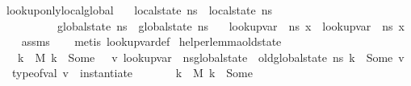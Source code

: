 \begin{isabellebody}
\isanewline
{}\isamarkupfalse%
\ lookup{\isacharunderscore}{\kern0pt}only{\isacharunderscore}{\kern0pt}local{\isacharunderscore}{\kern0pt}global{\isacharcolon}{\kern0pt}\isanewline
\ \ \ {\isachardoublequoteopen}local{\isacharunderscore}{\kern0pt}state\ ns\ {\isacharequal}{\kern0pt}\ local{\isacharunderscore}{\kern0pt}state\ ns{\isacharprime}{\kern0pt}{\isachardoublequoteclose}\ \isanewline
\ \ \ \ \ \ \ \ \ \ {\isachardoublequoteopen}global{\isacharunderscore}{\kern0pt}state\ ns\ {\isacharequal}{\kern0pt}\ global{\isacharunderscore}{\kern0pt}state\ ns{\isacharprime}{\kern0pt}{\isachardoublequoteclose}\isanewline
\ \ \ {\isachardoublequoteopen}lookup{\isacharunderscore}{\kern0pt}var\ {\isasymLambda}\ ns\ x\ {\isacharequal}{\kern0pt}\ lookup{\isacharunderscore}{\kern0pt}var\ {\isasymLambda}\ ns{\isacharprime}{\kern0pt}\ x{\isachardoublequoteclose}\isanewline
%
\isadelimproof
\ \ %
\endisadelimproof
%
\isatagproof
{}\isamarkupfalse%
\ assms\isanewline
\ \ \isamarkupfalse%
\ {\isacharparenleft}{\kern0pt}metis\ lookup{\isacharunderscore}{\kern0pt}var{\isacharunderscore}{\kern0pt}def{\isacharparenright}{\kern0pt}%
\endisatagproof
{\isafoldproof}%
%
\isadelimproof
\isanewline
%
\endisadelimproof
\isanewline
\isanewline
{}\isamarkupfalse%
\ helper{\isacharunderscore}{\kern0pt}lemma{\isacharunderscore}{\kern0pt}old{\isacharunderscore}{\kern0pt}state{\isacharcolon}{\kern0pt}\ \ \isanewline
\ \ \ {\isachardoublequoteopen}{\isasymforall}k\ {\isasymtau}{\isachardot}{\kern0pt}\ M\ k\ {\isacharequal}{\kern0pt}\ Some\ {\isasymtau}\ {\isasymlongrightarrow}\ {\isacharparenleft}{\kern0pt}{\isasymexists}v{\isachardot}{\kern0pt}\ lookup{\isacharunderscore}{\kern0pt}var\ {\isasymLambda}\ {\isacharparenleft}{\kern0pt}n{\isacharunderscore}{\kern0pt}s{\isasymlparr}global{\isacharunderscore}{\kern0pt}state\ {\isacharcolon}{\kern0pt}{\isacharequal}{\kern0pt}\ old{\isacharunderscore}{\kern0pt}global{\isacharunderscore}{\kern0pt}state\ n{\isacharunderscore}{\kern0pt}s{\isasymrparr}{\isacharparenright}{\kern0pt}\ k\ {\isacharequal}{\kern0pt}\ Some\ v\ {\isasymand}\ type{\isacharunderscore}{\kern0pt}of{\isacharunderscore}{\kern0pt}val\ v\ {\isacharequal}{\kern0pt}\ instantiate\ {\isasymOmega}\ {\isasymtau}{\isacharparenright}{\kern0pt}{\isachardoublequoteclose}\isanewline
\ \ \ {\isachardoublequoteopen}\ \ {\isasymforall}k\ {\isasymtau}{\isachardot}{\kern0pt}\ M\ k\ {\isacharequal}{\kern0pt}\ Some\ {\isasymtau}\ {\isasymlongrightarrow}\isanewline

\end{isabellebody}
